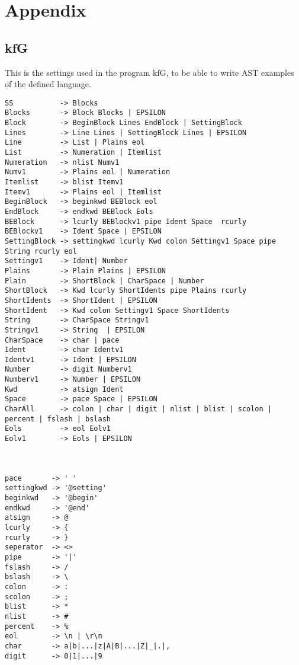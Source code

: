 \chapter{Appendix}
\section{kfG}
\label{AkfG}
This is the settings used in the program kfG, to be able to write AST examples of the defined language.
\begin{lstlisting}[frame=single]
SS           -> Blocks 
Blocks       -> Block Blocks | EPSILON 
Block        -> BeginBlock Lines EndBlock | SettingBlock
Lines        -> Line Lines | SettingBlock Lines | EPSILON 
Line         -> List | Plains eol
List         -> Numeration | Itemlist 
Numeration   -> nlist Numv1 
Numv1        -> Plains eol | Numeration 
Itemlist     -> blist Itemv1 
Itemv1       -> Plains eol | Itemlist 
BeginBlock   -> beginkwd BEBlock eol
EndBlock     -> endkwd BEBlock Eols
BEBlock      -> lcurly BEBlockv1 pipe Ident Space  rcurly
BEBlockv1    -> Ident Space | EPSILON
SettingBlock -> settingkwd lcurly Kwd colon Settingv1 Space pipe String rcurly eol
Settingv1    -> Ident| Number
Plains       -> Plain Plains | EPSILON
Plain        -> ShortBlock | CharSpace | Number
ShortBlock   -> Kwd lcurly ShortIdents pipe Plains rcurly
ShortIdents  -> ShortIdent | EPSILON 
ShortIdent   -> Kwd colon Settingv1 Space ShortIdents
String       -> CharSpace Stringv1
Stringv1     -> String  | EPSILON
CharSpace    -> char | pace
Ident        -> char Identv1
Identv1      -> Ident | EPSILON
Number       -> digit Numberv1
Numberv1     -> Number | EPSILON
Kwd          -> atsign Ident
Space        -> pace Space | EPSILON
CharAll      -> colon | char | digit | nlist | blist | scolon | percent | fslash | bslash
Eols         -> eol Eolv1
Eolv1        -> Eols | EPSILON



pace       -> ' ' 
settingkwd -> '@setting'
beginkwd   -> '@begin'
endkwd     -> '@end' 
atsign     -> @
lcurly     -> { 
rcurly     -> } 
seperator  -> <> 
pipe       -> '|' 
fslash     -> /
bslash     -> \
colon      -> : 
scolon     -> ; 
blist      -> * 
nlist      -> # 
percent    -> % 
eol        -> \n | \r\n 
char       -> a|b|...|z|A|B|...|Z|_|.|,
digit      -> 0|1|...|9
\end{lstlisting}